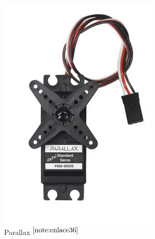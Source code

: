 \begin{figure}[ht!]
	\centering
	\begin{minipage}{0.2\linewidth}
		\centering
		\includegraphics[width=\linewidth]{figs/parallax.png}
		\caption*{\centering Parallax $^{\ref{note:enlace36}}$} %
	\end{minipage}
	\hspace{2cm}
	\begin{minipage}{0.33\linewidth}
		\centering

\end{minipage}
\end{figure}
